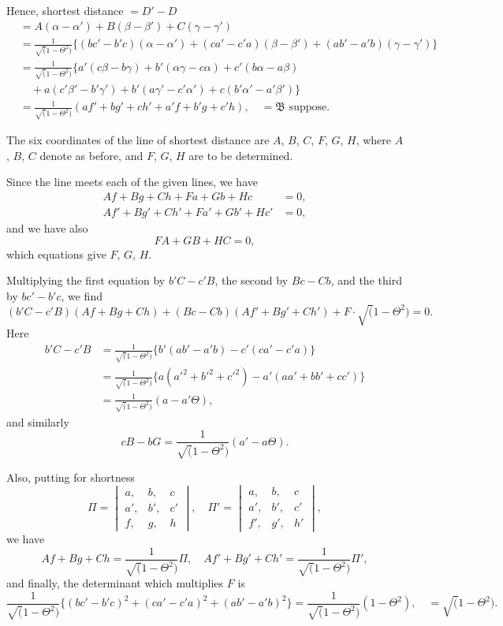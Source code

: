 \documentclass[11pt,a4paper]{book}
\begin{document}
Hence, shortest distance $= D' - D$
\begin{align*}
&= A(\alpha - \alpha') + B(\beta - \beta') + C(\gamma - \gamma') \\
&= \frac{1}{\surd(1 - \Theta^2)} \{(bc' - b'c)(\alpha - \alpha') + (ca' - c'a)(\beta - \beta') + (ab' - a'b)(\gamma - \gamma')\} \\
&= \frac{1}{\surd(1 - \Theta^2)} \{a'(c\beta - b\gamma) + b'(\alpha\gamma - c\alpha) + c'(b\alpha - a\beta) \\
&\quad + a(c'\beta' - b'\gamma') + b'(a\gamma' - c'\alpha') + c(b'\alpha' - a'\beta')\} \\
&= \frac{1}{\surd(1 - \Theta^2)} (af' + bg' + ch' + a'f + b'g + c'h), \quad = \mathfrak{B} \text{ suppose}.
\end{align*}

The six coordinates of the line of shortest distance are $A$, $B$, $C$, $F$, $G$, $H$, where $A$, $B$, $C$ denote as before, and $F$, $G$, $H$ are to be determined.

Since the line meets each of the given lines, we have
\begin{align*}
Af + Bg + Ch + Fa + Gb + Hc &= 0, \\
Af' + Bg' + Ch' + Fa' + Gb' + Hc' &= 0,
\end{align*}
and we have also
\[
FA + GB + HC = 0,
\]
which equations give $F$, $G$, $H$.

Multiplying the first equation by $b'C - c'B$, the second by $Bc - Cb$, and the third by $bc' - b'c$, we find
\[
(b'C - c'B)(Af + Bg + Ch) + (Bc - Cb)(Af' + Bg' + Ch') + F \cdot \surd(1 - \Theta^2) = 0.
\]
Here
\begin{align*}
b'C - c'B &= \frac{1}{\surd(1 - \Theta^2)} \{b'(ab' - a'b) - c'(ca' - c'a)\} \\
&= \frac{1}{\surd(1 - \Theta^2)} \{a(a'^2 + b'^2 + c'^2) - a'(aa' + bb' + cc')\} \\
&= \frac{1}{\surd(1 - \Theta^2)} (a - a'\Theta),
\end{align*}
and similarly
\[
cB - bG = \frac{1}{\surd(1 - \Theta^2)} (a' - a\Theta).
\]

Also, putting for shortness
\[
\Pi = \begin{vmatrix} a, & b, & c \\ a', & b', & c' \\ f, & g, & h \end{vmatrix}, \quad \Pi' = \begin{vmatrix} a, & b, & c \\ a', & b', & c' \\ f', & g', & h' \end{vmatrix},
\]
we have
\[
Af + Bg + Ch = \frac{1}{\surd(1 - \Theta^2)} \Pi, \quad Af' + Bg' + Ch' = \frac{1}{\surd(1 - \Theta^2)} \Pi',
\]
and finally, the determinant which multiplies $F$ is
\[
\frac{1}{\surd(1 - \Theta^2)} \{(bc' - b'c)^2 + (ca' - c'a)^2 + (ab' - a'b)^2\} = \frac{1}{\surd(1 - \Theta^2)} (1 - \Theta^2), \quad = \surd(1 - \Theta^2).
\]
\end{document}
